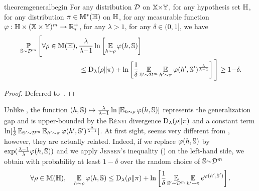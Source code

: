 \begin{restatable}{theorem}{generalbegin}\label{chap:pac-bayes:theorem:general-begin}
For any distribution $\mathcal{D}$ on $\mathbb{X}{\times}\mathbb{Y}$, for any hypothesis set $\mathbb{H}$, for any distribution $\pi\in\mathbb{M}^{*}(\mathbb{H})$ on $\mathbb{H}$, for any measurable function $\varphi: \mathbb{H}\times(\mathbb{X}\times\mathbb{Y})^m\to \mathbb{R}_{*}^{+}$, for any $\lambda > 1$, for any $\delta\in(0,1]$, we have
\begin{align*}
&\PP_{\S\sim\D^{\m}}\Bigg[ \forall \Q\in\M(\H), \frac{\lambda}{\lambda{-}1}
   \ln \LB\EE_{\h{\sim}\Q}\varphi(\h,\S)\RB\\
&\hspace{3cm}\le \Renyi_{\lambda}(\Q\|\P) + \ln\LB\frac{1}{\delta}\EE_{\S'{\sim}\D^{\m}}\EE_{\h'{\sim}\P}\varphi(\h',\S')^\frac{\lambda}{\lambda{-}1}\RB \Bigg] \ge 1{-}\delta.
\end{align*}
\end{restatable}
\begin{noaddcontents}\begin{proof}
Deferred to~.
\end{proof}\end{noaddcontents}

Unlike , the function $(h,\mathbb{S}) \mapsto \frac{\lambda}{\lambda{-}1}\ln \left[\operatorname*{\mathbb{E}}_{h{\sim}\rho}\varphi(h,\mathbb{S})\right]$ represents the generalization gap and is upper-bounded by the \textsc{Rényi} divergence $\operatorname{D}_{\lambda}(\rho\|\pi)$ and a constant term $\ln[\frac{1}{\delta}\operatorname*{\mathbb{E}}_{\mathbb{S}'{\sim}\mathcal{D}^{m}}\operatorname*{\mathbb{E}}_{h'{\sim}\pi}\varphi(h',\mathbb{S}')^\frac{\lambda}{\lambda{-}1}]$.
At first sight,  seems very different from , however, they are actually related.
Indeed, if we replace $\varphi(h,\mathbb{S})$ by $\exp(\tfrac{\lambda{-}1}{\lambda}\varphi(h,\mathbb{S}))$ and we apply \textsc{Jensen}'s inequality () on the left-hand side, we obtain with probability at least $1{-}\delta$ over the random choice of $\mathbb{S}{\sim}\mathcal{D}^m$
\begin{align*}
    \forall \rho\in\mathbb{M}(\mathbb{H}),\quad \operatorname*{\mathbb{E}}_{h\sim\rho}\varphi(h,\mathbb{S}) \le \operatorname{D}_{\lambda}(\rho\|\pi) + \ln\left[\frac{1}{\delta}\operatorname*{\mathbb{E}}_{\mathbb{S}'{\sim}\mathcal{D}^{m}}\operatorname*{\mathbb{E}}_{h'{\sim}\pi}e^{\varphi(h',\mathbb{S}')} \right].
\end{align*}

